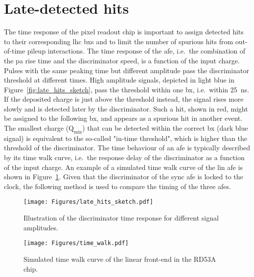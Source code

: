 
\section{Late-detected hits}
\label{sec:late}

The time response of the pixel readout chip is important to assign detected hits to their corresponding \gls{lhc} \glspl{bx} and to limit the number of spurious hits from out-of-time pileup interactions.
The time response of the \gls{afe}, i.e.~the combination of the \gls{pa} rise time and the discriminator speed, is a function of the input charge. Pulses with the same peaking time but different amplitude pass the discriminator threshold at different times. High amplitude signals, depicted in light blue in Figure~\ref{fig:late_hits_sketch}, pass the threshold within one \gls{bx}, i.e.~within \SI{25}{\nano\second}. If the deposited charge is just above the threshold instead, the signal rises more slowly and is detected later by the discriminator. Such a hit, shown in red, might be assigned to the following \gls{bx}, and appears as a spurious hit in another event. The smallest charge ($\mathrm{Q_{min}}$) that can be detected within the correct \gls{bx} (dark blue signal) is equivalent to the so-called "in-time threshold", which is higher than the threshold of the discriminator. 
The time behaviour of an \gls{afe} is typically described by its time walk curve, i.e.~the response delay of the discriminator as a function of the input charge. An example of a simulated time walk curve of the \gls{lin} \gls{afe} is shown in Figure~\ref{fig:time_walk}. Given that the discriminator of the \gls{sync} \gls{afe} is locked to the clock, the following method is used to compare the timing of the three \glspl{afe}.


\begin{figure}[t]
    \centering
    \captionsetup{justification=centering}
    \begin{minipage}{0.49\textwidth}
        \centering
        \texttt{[image: Figures/late\_hits\_sketch.pdf]}
        \caption{Illustration of the discriminator time response for different signal amplitudes.}
        \label{fig:late_hits_sketch}
    \end{minipage}
    \hfill
    \begin{minipage}{0.49\textwidth}
        \centering
        \texttt{[image: Figures/time\_walk.pdf]}
        \caption{Simulated time walk curve of the linear front-end in the RD53A chip.}
        \label{fig:time_walk}
    \end{minipage}
\end{figure}




